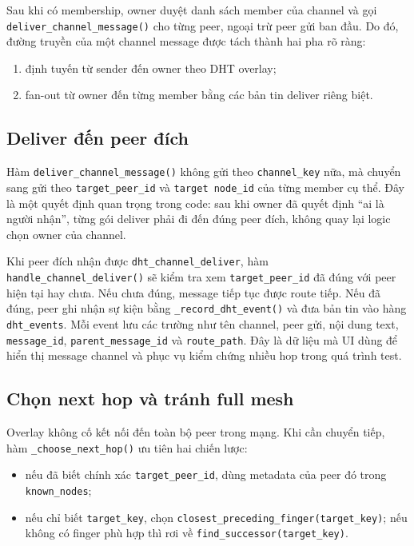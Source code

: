 Sau khi có membership, owner duyệt danh sách member của channel và gọi \texttt{deliver\_channel\_message()} cho từng peer, ngoại trừ peer gửi ban đầu. Do đó, đường truyền của một channel message được tách thành hai pha rõ ràng:
\begin{enumerate}[leftmargin=2em]
    \item định tuyến từ sender đến owner theo DHT overlay;
    \item fan-out từ owner đến từng member bằng các bản tin deliver riêng biệt.
\end{enumerate}

\subsection{Deliver đến peer đích}
Hàm \texttt{deliver\_channel\_message()} không gửi theo \texttt{channel\_key} nữa, mà chuyển sang gửi theo \texttt{target\_peer\_id} và \texttt{target node\_id} của từng member cụ thể. Đây là một quyết định quan trọng trong code: sau khi owner đã quyết định ``ai là người nhận'', từng gói deliver phải đi đến đúng peer đích, không quay lại logic chọn owner của channel.

Khi peer đích nhận được \texttt{dht\_channel\_deliver}, hàm \texttt{handle\_channel\_deliver()} sẽ kiểm tra xem \texttt{target\_peer\_id} đã đúng với peer hiện tại hay chưa. Nếu chưa đúng, message tiếp tục được route tiếp. Nếu đã đúng, peer ghi nhận sự kiện bằng \texttt{\_record\_dht\_event()} và đưa bản tin vào hàng \texttt{dht\_events}. Mỗi event lưu các trường như tên channel, peer gửi, nội dung text, \texttt{message\_id}, \texttt{parent\_message\_id} và \texttt{route\_path}. Đây là dữ liệu mà UI dùng để hiển thị message channel và phục vụ kiểm chứng nhiều hop trong quá trình test.

\subsection{Chọn next hop và tránh full mesh}
Overlay không cố kết nối đến toàn bộ peer trong mạng. Khi cần chuyển tiếp, hàm \texttt{\_choose\_next\_hop()} ưu tiên hai chiến lược:
\begin{itemize}[leftmargin=2em]
    \item nếu đã biết chính xác \texttt{target\_peer\_id}, dùng metadata của peer đó trong \texttt{known\_nodes};
    \item nếu chỉ biết \texttt{target\_key}, chọn \texttt{closest\_preceding\_finger(target\_key)}; nếu không có finger phù hợp thì rơi về \texttt{find\_successor(target\_key)}.
\end{itemize}

